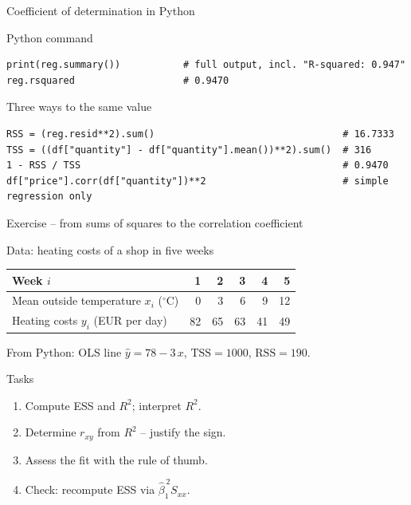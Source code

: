 \documentclass[aspectratio=169,11pt]{beamer}
\begin{document}
\begin{frame}[fragile]{Coefficient of determination in Python}
  \begin{block}{Python command}
\begin{lstlisting}
print(reg.summary())           # full output, incl. "R-squared: 0.947"
reg.rsquared                   # 0.9470
\end{lstlisting}
  \end{block}

  \begin{exampleblock}{Three ways to the same value}
\begin{lstlisting}
RSS = (reg.resid**2).sum()                                 # 16.7333
TSS = ((df["quantity"] - df["quantity"].mean())**2).sum()  # 316
1 - RSS / TSS                                              # 0.9470
df["price"].corr(df["quantity"])**2                        # simple regression only
\end{lstlisting}
  \end{exampleblock}
\end{frame}

\begin{frame}{Exercise -- from sums of squares to the correlation coefficient}
  \begin{block}{Data: heating costs of a shop in five weeks}
    \vspace{-2pt}
    \begin{center}
      \renewcommand{\arraystretch}{1.05}
      \begin{tabular}{l*{5}{r}}
        \toprule
        Week $i$                                      & 1  & 2  & 3  & 4  & 5  \\
        \midrule
        Mean outside temperature $x_i$ ($^\circ$C)    & 0  & 3  & 6  & 9  & 12 \\
        Heating costs $y_i$ (EUR per day)            & 82 & 65 & 63 & 41 & 49 \\
        \bottomrule
      \end{tabular}
    \end{center}
    \vspace{-2pt}
    From Python: OLS line $\hat{y} = 78 - 3\,x$, \quad $\text{TSS} = 1000$, \quad $\text{RSS} = 190$.
  \end{block}

  \begin{exampleblock}{Tasks}
    \begin{enumerate}
      \item Compute ESS and $R^{2}$; interpret $R^{2}$.
      \item Determine $r_{xy}$ from $R^{2}$ -- justify the sign.
      \item Assess the fit with the rule of thumb.
      \item Check: recompute ESS via $\hat{\beta}_1^{\,2} S_{xx}$.
    \end{enumerate}
  \end{exampleblock}
\end{frame}
\end{document}
